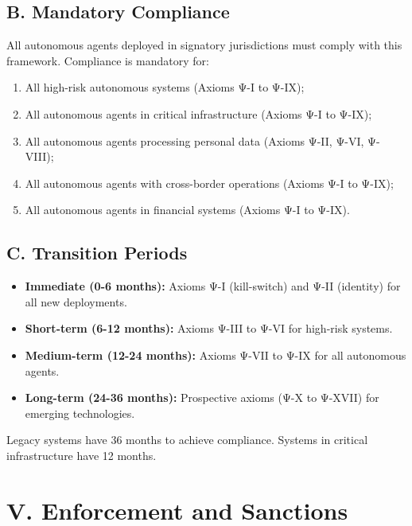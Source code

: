\subsection*{B. Mandatory Compliance}

All autonomous agents deployed in signatory jurisdictions must comply with this framework. Compliance is mandatory for:

\begin{enumerate}[leftmargin=1.5cm]
    \item All high-risk autonomous systems (Axioms Ψ-I to Ψ-IX);
    \item All autonomous agents in critical infrastructure (Axioms Ψ-I to Ψ-IX);
    \item All autonomous agents processing personal data (Axioms Ψ-II, Ψ-VI, Ψ-VIII);
    \item All autonomous agents with cross-border operations (Axioms Ψ-I to Ψ-IX);
    \item All autonomous agents in financial systems (Axioms Ψ-I to Ψ-IX).
\end{enumerate}

\subsection*{C. Transition Periods}

\begin{itemize}[leftmargin=1.5cm]
    \item \textbf{Immediate (0-6 months):} Axioms Ψ-I (kill-switch) and Ψ-II (identity) for all new deployments.
    \item \textbf{Short-term (6-12 months):} Axioms Ψ-III to Ψ-VI for high-risk systems.
    \item \textbf{Medium-term (12-24 months):} Axioms Ψ-VII to Ψ-IX for all autonomous agents.
    \item \textbf{Long-term (24-36 months):} Prospective axioms (Ψ-X to Ψ-XVII) for emerging technologies.
\end{itemize}

Legacy systems have 36 months to achieve compliance. Systems in critical infrastructure have 12 months.

\vspace{0.5cm}

\section*{V. Enforcement and Sanctions}

